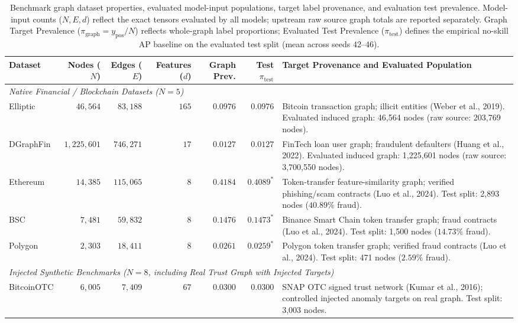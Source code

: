 \documentclass[applsci,article,submit,moreauthors,pdftex]{Definitions/mdpi}
\begin{document}
\begin{table}[htbp]
\centering\small
\caption{Benchmark graph dataset properties, evaluated model-input populations, target label provenance, and evaluation test prevalence. Model-input counts ($N, E, d$) reflect the exact tensors evaluated by all models; upstream raw source graph totals are reported separately. Graph Target Prevalence ($\pi_{\mathrm{graph}} = y_{\mathrm{pos}} / N$) reflects whole-graph label proportions; Evaluated Test Prevalence ($\pi_{\mathrm{test}}$) defines the empirical no-skill AP baseline on the evaluated test split (mean across seeds 42--46).}
\label{tab:dataset_properties}
\begin{tabularx}{\textwidth}{lrrrrrX}\toprule
\textbf{Dataset} & \textbf{Nodes ($N$)} & \textbf{Edges ($E$)} & \textbf{Features ($d$)} & \textbf{Graph Prev.} & \textbf{Test $\pi_{\mathrm{test}}$} & \textbf{Target Provenance and Evaluated Population} \\\midrule
\multicolumn{7}{l}{\textit{Native Financial / Blockchain Datasets ($N=5$)}} \\
Elliptic & $46,564$ & $83,188$ & $165$ & $0.0976$ & $0.0976$ & Bitcoin transaction graph; illicit entities (Weber et al., 2019). Evaluated induced graph: 46,564 nodes (raw source: 203,769 nodes). \\
DGraphFin & $1,225,601$ & $746,271$ & $17$ & $0.0127$ & $0.0127$ & FinTech loan user graph; fraudulent defaulters (Huang et al., 2022). Evaluated induced graph: 1,225,601 nodes (raw source: 3,700,550 nodes). \\
Ethereum & $14,385$ & $115,065$ & $8$ & $0.4184$ & $0.4089^*$ & Token-transfer feature-similarity graph; verified phishing/scam contracts (Luo et al., 2024). Test split: 2,893 nodes ($40.89\%$ fraud). \\
BSC & $7,481$ & $59,832$ & $8$ & $0.1476$ & $0.1473^*$ & Binance Smart Chain token transfer graph; fraud contracts (Luo et al., 2024). Test split: 1,500 nodes ($14.73\%$ fraud). \\
Polygon & $2,303$ & $18,411$ & $8$ & $0.0261$ & $0.0259^*$ & Polygon token transfer graph; verified fraud contracts (Luo et al., 2024). Test split: 471 nodes ($2.59\%$ fraud). \\
\midrule
\multicolumn{7}{l}{\textit{Injected Synthetic Benchmarks ($N=8$, including Real Trust Graph with Injected Targets)}} \\
BitcoinOTC & $6,005$ & $7,409$ & $67$ & $0.0300$ & $0.0300$ & SNAP OTC signed trust network (Kumar et al., 2016); controlled injected anomaly targets on real graph. Test split: 3,003 nodes. \\

\end{tabularx}
\end{table}
\end{document}
